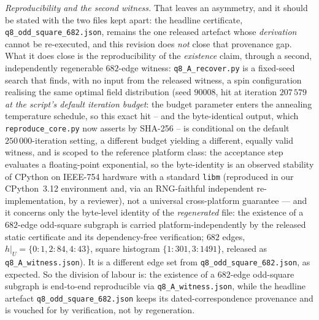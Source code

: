 \documentclass[12pt]{article}
\begin{document}
\medskip\noindent\emph{Reproducibility and the second witness.} That leaves an
asymmetry, and it should be stated with the two files kept apart: the
headline certificate, \texttt{q8\_odd\_square\_682.json}, remains the one
released artefact whose \emph{derivation} cannot be re-executed, and this
revision does \emph{not} close that provenance gap. What it does close is
the reproducibility of the \emph{existence} claim, through a second,
independently regenerable $682$-edge witness:
\texttt{q8\_A\_recover.py} is a fixed-seed search that finds, with no input from
the released witness, a spin configuration realising the same optimal field
distribution (seed $90008$, hit at iteration $207\,579$ \emph{at the
script's default iteration budget}: the budget parameter enters the annealing
temperature schedule, so this exact hit -- and the byte-identical output,
which \texttt{reproduce\_core.py} now asserts by SHA-256 -- is conditional
on the default $250\,000$-iteration setting, a different budget yielding a
different, equally valid witness, and is scoped to the reference platform
class: the acceptance step evaluates a floating-point exponential, so the
byte-identity is an observed stability of CPython on IEEE-754 hardware with
a standard \texttt{libm} (reproduced in our CPython~3.12 environment and,
via an RNG-faithful independent re-implementation, by a reviewer), not a
universal cross-platform guarantee --- and it concerns only the byte-level
identity of the \emph{regenerated} file: the existence of a $682$-edge
odd-square subgraph is carried platform-independently by the released
static certificate and its dependency-free verification; $682$ edges,
$h|_U=\{0{:}1,2{:}84,4{:}43\}$, square histogram $\{1{:}301,3{:}1491\}$,
released as \texttt{q8\_A\_witness.json}). It is a different edge set
from \texttt{q8\_odd\_square\_682.json}, as expected. So the division of
labour is: the existence of a $682$-edge odd-square subgraph is
end-to-end reproducible via \texttt{q8\_A\_witness.json}, while the
headline artefact \texttt{q8\_odd\_square\_682.json} keeps its
dated-correspondence provenance and is vouched for by verification, not
by regeneration.
\end{document}
